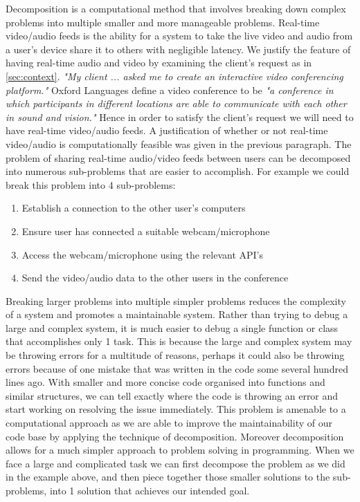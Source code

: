 Decomposition is a computational method that involves breaking
down complex problems into multiple smaller and more
manageable problems. Real-time video/audio feeds is the ability
for a system to take the live video and audio from a user's
device share it to others with negligible latency. We justify
the feature of having real-time audio and video by examining
the client's request as in \ref{sec:context}. \textit{"My
client ... asked me to create an interactive video conferencing
platform."} Oxford Languages define a video conference to be
\textit{"a conference in which participants in different
locations are able to communicate with each other in sound and
vision."} Hence in order to satisfy the client's request we
will need to have real-time video/audio feeds. A justification
of whether or not real-time video/audio is computationally
feasible was given in the previous paragraph.
The problem of sharing real-time audio/video feeds between
users can be decomposed into numerous sub-problems that are
easier to accomplish. For example we could break this problem
into 4 sub-problems:

\begin{enumerate}
  \item Establish a connection to the other user's computers
  \item Ensure user has connected a suitable webcam/microphone
  \item Access the webcam/microphone using the relevant API's
  \item{Send the video/audio data to the other users in the
        conference}
\end{enumerate}

Breaking larger problems into multiple simpler problems
reduces the complexity of a system and promotes a
maintainable system. Rather than trying to debug a large and
complex system, it is much easier to debug a single function
or class
that accomplishes only 1 task. This is because the large and
complex system may be throwing errors for a multitude of
reasons, perhaps it could also be throwing errors because of
one mistake that was written in the code some several hundred
lines ago. With smaller and more concise code organised into
functions and similar structures, we can tell exactly where the
code is throwing an error and start working on resolving the
issue immediately. This problem is amenable to a computational
approach as we are able to improve the maintainability of our
code base by applying the technique of decomposition. Moreover
decomposition allows for a much simpler approach to problem
solving in programming. When we face a large and complicated
task we can first decompose the problem as we did in the
example above, and then piece together those smaller solutions
to the sub-problems, into 1 solution that achieves our intended
goal. \vspace{0.2cm}

